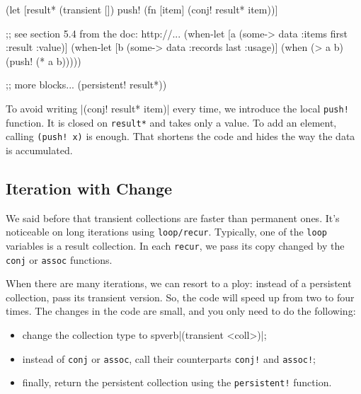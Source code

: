 \else

\begin{clojure}
(let [result* (transient [])
      push! (fn [item]
              (conj! result* item))]

  ;; see section 5.4 from the doc: http://...
  (when-let [a (some-> data :items first :result :value)]
    (when-let [b (some-> data :records last :usage)]
      (when (> a b)
        (push! (* a b)))))

  ;; more blocks...
  (persistent! result*))
\end{clojure}

\fi


\noindent
To avoid writing \spverb|(conj! result* item)| every time, we introduce the local \verb|push!| function.
It is closed on \verb|result*| and takes only a value.
To add an element, calling \verb|(push! x)| is enough. That shortens the code and hides the way the data is accumulated.

\subsection{Iteration with Change}


We said before that transient collections are faster than permanent ones. It's noticeable on long iterations using \verb|loop/recur|.
Typically, one of the \verb|loop| variables is a result collection.
In each \verb|recur|, we pass its copy changed by the \verb|conj| or \verb|assoc| functions.

When there are many iterations, we can resort to a ploy: instead of a persistent collection, pass its transient version. So, the code will speed up from two to four times. The changes in the code are small, and you only need to do the following:

\begin{itemize}

\item
  change the collection type to spverb|(transient <coll>)|;

\item
  instead of \verb|conj| or \verb|assoc|, call their counterparts \verb|conj!| and \verb|assoc!|;

\item
  finally, return the persistent collection using the \verb|persistent!| function.

\end{itemize}

